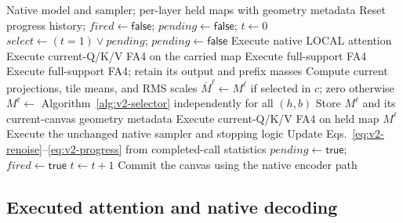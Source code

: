 \begin{algorithm}[t]
\caption{V2 within the unchanged native denoising loop}
\label{alg:v2-reuse}
\small
\begin{algorithmic}[1]
\Require Native model and sampler; per-layer held maps with geometry metadata
    \State Reset progress history; $\mathit{fired}\gets\mathsf{false}$;
           $\mathit{pending}\gets\mathsf{false}$; $t\gets0$
        \State $\mathit{select}\gets(t=1)\lor\mathit{pending}$;
               $\mathit{pending}\gets\mathsf{false}$
                \State Execute native LOCAL attention
                    \State Execute current-Q/K/V FA4 on the carried map
                \Else
                    \State Execute full-support FA4
                \EndIf
                \State Execute full-support FA4; retain its output and prefix masses
                \State Compute current projections, tile means, and RMS scales
                \State $\overline M^\ell\gets M^\ell$ if selected in $c$; zero otherwise
                \State $M^\ell\gets$ Algorithm~\ref{alg:v2-selector} independently for all $(h,b)$
                \State Store $M^\ell$ and its current-canvas geometry metadata
            \Else
                \State Execute current-Q/K/V FA4 on held map $M^\ell$
            \EndIf
        \EndFor
        \State Execute the unchanged native sampler and stopping logic
            \State Update Eqs.~\eqref{eq:v2-renoise}--\eqref{eq:v2-progress} from completed-call statistics
                \State $\mathit{pending}\gets\mathsf{true}$;
                       $\mathit{fired}\gets\mathsf{true}$
            \EndIf
        \EndIf
        \State $t\gets t+1$
    \EndWhile
    \State Commit the canvas using the native encoder path
\EndFor
\end{algorithmic}
\end{algorithm}

\subsection{Executed attention and native decoding}
\label{sec:v2-execution}

